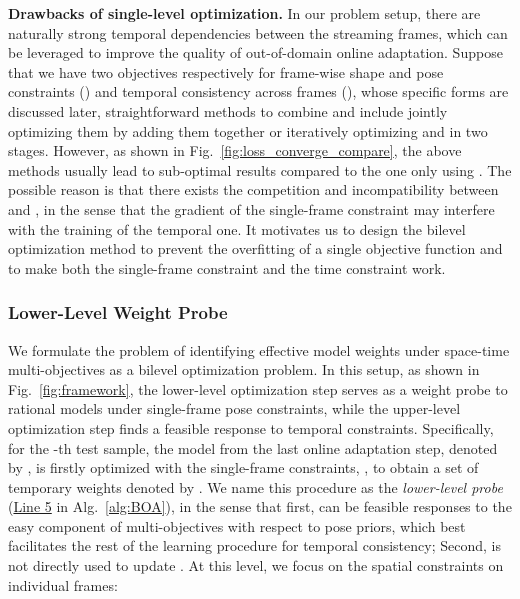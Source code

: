 \documentclass[10pt,journal,compsoc]{IEEEtran}
\newcommand{\fig}[1]{Fig.~\ref{#1}}
\newcommand{\alg}[1]{Alg.~\ref{#1}}
\newcommand{\myparagraph}[1]{\vspace{5pt} \noindent \textbf{#1}}
\begin{document}
\myparagraph{Drawbacks of single-level optimization.} 
In our problem setup, there are naturally strong temporal dependencies between the streaming frames, which can be leveraged to improve the quality of out-of-domain online adaptation. Suppose that we have two objectives respectively for frame-wise shape and pose constraints () and temporal consistency across frames (), whose specific forms are discussed later, straightforward methods to combine  and  include jointly optimizing them by adding them together or iteratively optimizing  and  in two stages.
However, as shown in \fig{fig:loss_converge_compare}, the above methods usually lead to sub-optimal results compared to the one only using . The possible reason is that there exists the competition and incompatibility between  and , in the sense that the gradient of the single-frame constraint may interfere with the training of the temporal one.
It motivates us to design the bilevel optimization method to prevent the overfitting of a single objective function and to make both the single-frame constraint and the time constraint work.



\subsubsection{Lower-Level Weight Probe}
We formulate the problem of identifying effective model weights under space-time multi-objectives as a bilevel optimization problem. 
In this setup, as shown in \fig{fig:framework}, the lower-level optimization step serves as a weight probe to rational models under single-frame pose constraints, while the upper-level optimization step finds a feasible response to temporal constraints.
Specifically, for the -th test sample, the model from the last online adaptation step, denoted by , is firstly optimized with the single-frame constraints, , to obtain a set of temporary weights denoted by . 
We name this procedure as the \textit{lower-level probe} (\underline{Line 5} in \alg{alg:BOA}), in the sense that first,  can be feasible responses to the easy component of multi-objectives with respect to pose priors, which best facilitates the rest of the learning procedure for temporal consistency; Second,  is not directly used to update . 
At this level, we focus on the spatial constraints on individual frames:
\end{document}
